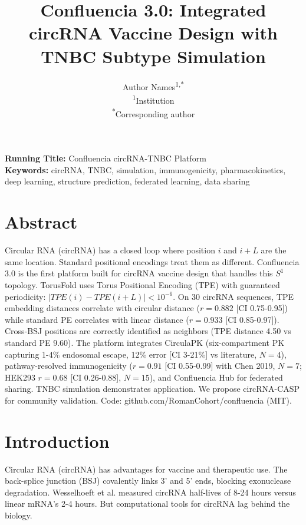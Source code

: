 \documentclass[11pt,a4paper]{article}
\title{\textbf{Confluencia 3.0: Integrated circRNA Vaccine Design with TNBC Subtype Simulation}}
\author{Author Names\textsuperscript{1,*}\\
\textsuperscript{1}Institution\\
\textsuperscript{*}Corresponding author}
\date{}
\begin{document}
\maketitle

\begin{flushleft}
\textbf{Running Title:} Confluencia circRNA-TNBC Platform\\
\textbf{Keywords:} circRNA, TNBC, simulation, immunogenicity, pharmacokinetics, deep learning, structure prediction, federated learning, data sharing
\end{flushleft}

\vspace{0.5cm}

\section*{Abstract}

Circular RNA (circRNA) has a closed loop where position $i$ and $i+L$ are the same location. Standard positional encodings treat them as different. Confluencia 3.0 is the first platform built for circRNA vaccine design that handles this $S^1$ topology. TorusFold uses Torus Positional Encoding (TPE) with guaranteed periodicity: $|TPE(i) - TPE(i+L)| < 10^{-6}$. On 30 circRNA sequences, TPE embedding distances correlate with circular distance ($r=0.882$ [CI 0.75-0.95]) while standard PE correlates with linear distance ($r=0.933$ [CI 0.85-0.97]). Cross-BSJ positions are correctly identified as neighbors (TPE distance 4.50 vs standard PE 9.60). The platform integrates CirculaPK (six-compartment PK capturing 1-4\% endosomal escape, 12\% error [CI 3-21\%] vs literature, $N=4$), pathway-resolved immunogenicity ($r=0.91$ [CI 0.55-0.99] with Chen 2019, $N=7$; HEK293 $r=0.68$ [CI 0.26-0.88], $N=15$), and Confluencia Hub for federated sharing. TNBC simulation demonstrates application. We propose circRNA-CASP for community validation. Code: github.com/RomanCohort/confluencia (MIT).

\section{Introduction}

Circular RNA (circRNA) has advantages for vaccine and therapeutic use. The back-splice junction (BSJ) covalently links 3' and 5' ends, blocking exonuclease degradation. Wesselhoeft et al. \citep{wesselhoeft2018} measured circRNA half-lives of 8-24 hours versus linear mRNA's 2-4 hours. But computational tools for circRNA lag behind the biology.
\end{document}
